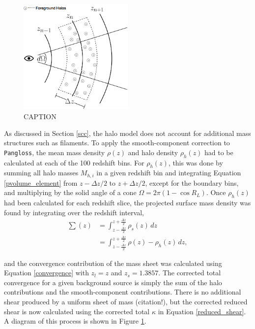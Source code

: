 \documentclass[%
 reprint,
 amsmath,amssymb,
 aps,nofootinbib
]{revtex4-1}
\begin{document}
\begin{figure}
    \centering
    \includegraphics[width=0.5\textwidth]{figs-swe/thesis/smooth_correction.png}
    \captionsetup{justification=raggedright,singlelinecheck=false}
    \caption{CAPTION}
    \label{fig:scc}
\end{figure}

As discussed in Section \ref{scc}, the halo model does not account for additional mass structures such as filaments. To apply the smooth-component correction to \texttt{Pangloss}, the mean mass density $\rho(z)$ and halo density $\rho_h(z)$ had to be calculated at each of the 100 redshift bins. For $\rho_h(z)$, this was done by summing all halo masses $M_{h,i}$ in a given redshift bin and integrating Equation \eqref{pvolume_element} from ${z-\Delta z/2}$ to ${z+\Delta z/2}$, except for the boundary bins, and multiplying by the solid angle of a cone ${\Omega=2\pi(1-\cos R_L)}$. Once $\rho_h(z)$ had been calculated for each redshift slice, the projected surface mass density was found by integrating over the redshift interval,
\begin{align}\label{surface_density} 
\sum(z)&=\int_{z-\frac{\Delta z}{2}}^{z+\frac{\Delta z}{2}} \rho_s(z)\,dz\nonumber\\
&=\int_{z-\frac{\Delta z}{2}}^{z+\frac{\Delta z}{2}} \rho(z)-\rho_h(z)\,dz,
\end{align}

\noindent and the convergence contribution of the mass sheet was calculated using Equation \eqref{convergence} with ${z_l=z}$ and ${z_s=1.3857}$. The corrected total convergence for a given background source is simply the sum of the halo contributions and the smooth-component contributions. There is no additional shear produced by a uniform sheet of mass (citation!), but the corrected reduced shear is now calculated using the corrected total $\kappa$ in Equation \eqref{reduced_shear}. A diagram of this process is shown in Figure \ref{fig:scc}.
\end{document}
